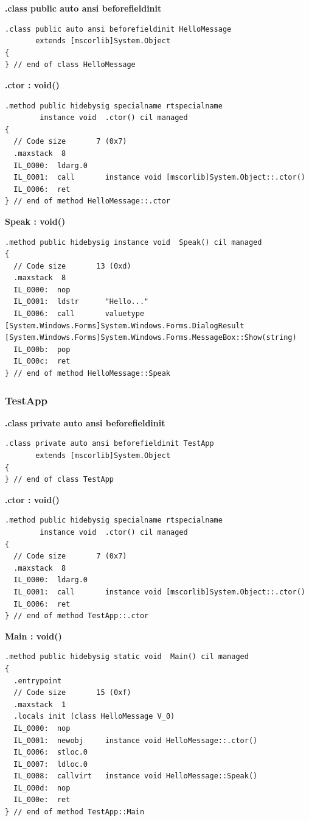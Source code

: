 \textbf{.class public auto ansi beforefieldinit}
\begin{lstlisting}[style=Csharp]
.class public auto ansi beforefieldinit HelloMessage
       extends [mscorlib]System.Object
{
} // end of class HelloMessage
\end{lstlisting}

\textbf{.ctor : void()}
\begin{lstlisting}[style=Csharp]
.method public hidebysig specialname rtspecialname 
        instance void  .ctor() cil managed
{
  // Code size       7 (0x7)
  .maxstack  8
  IL_0000:  ldarg.0
  IL_0001:  call       instance void [mscorlib]System.Object::.ctor()
  IL_0006:  ret
} // end of method HelloMessage::.ctor
\end{lstlisting}

\textbf{Speak : void()}
\begin{lstlisting}[style=Csharp]
.method public hidebysig instance void  Speak() cil managed
{
  // Code size       13 (0xd)
  .maxstack  8
  IL_0000:  nop
  IL_0001:  ldstr      "Hello..."
  IL_0006:  call       valuetype [System.Windows.Forms]System.Windows.Forms.DialogResult [System.Windows.Forms]System.Windows.Forms.MessageBox::Show(string)
  IL_000b:  pop
  IL_000c:  ret
} // end of method HelloMessage::Speak
\end{lstlisting}

\subsubsection{TestApp}
\textbf{.class private auto ansi beforefieldinit}
\begin{lstlisting}[style=Csharp]
.class private auto ansi beforefieldinit TestApp
       extends [mscorlib]System.Object
{
} // end of class TestApp
\end{lstlisting}

\textbf{.ctor : void()}
\begin{lstlisting}[style=Csharp]
.method public hidebysig specialname rtspecialname 
        instance void  .ctor() cil managed
{
  // Code size       7 (0x7)
  .maxstack  8
  IL_0000:  ldarg.0
  IL_0001:  call       instance void [mscorlib]System.Object::.ctor()
  IL_0006:  ret
} // end of method TestApp::.ctor
\end{lstlisting}

\textbf{Main : void()}
\begin{lstlisting}[style=Csharp]
.method public hidebysig static void  Main() cil managed
{
  .entrypoint
  // Code size       15 (0xf)
  .maxstack  1
  .locals init (class HelloMessage V_0)
  IL_0000:  nop
  IL_0001:  newobj     instance void HelloMessage::.ctor()
  IL_0006:  stloc.0
  IL_0007:  ldloc.0
  IL_0008:  callvirt   instance void HelloMessage::Speak()
  IL_000d:  nop
  IL_000e:  ret
} // end of method TestApp::Main
\end{lstlisting}


